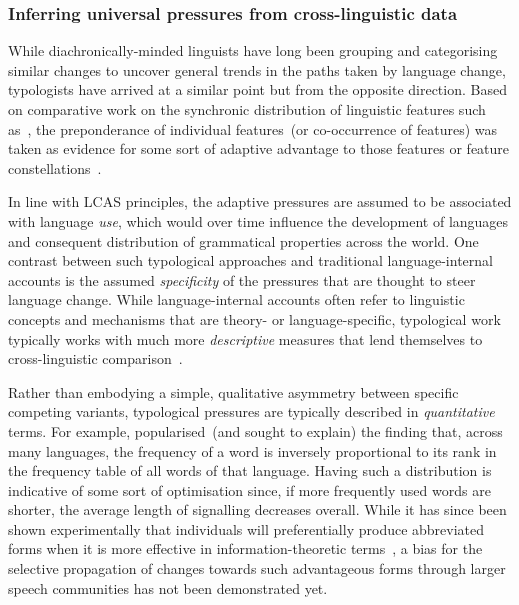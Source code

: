 \subsubsection{Inferring universal pressures from cross-linguistic data}

While diachronically-minded linguists have long been grouping and categorising similar changes to uncover general trends in the paths taken by language change, typologists have arrived at a similar point but from the opposite direction. Based on comparative work on the synchronic distribution of linguistic features such as~\citet{Greenberg1963}, the preponderance of individual features~(or co-occurrence of features) was taken as evidence for some sort of adaptive advantage to those features or feature constellations~\citep{Haspelmath2008}.

In line with LCAS principles, the adaptive pressures are assumed to be associated with language \emph{use}, which would over time influence the development of languages and consequent distribution of grammatical properties across the world.
One contrast between such typological approaches and traditional language-internal accounts is the assumed \emph{specificity} of the pressures that are thought to steer language change. While language-internal accounts often refer to linguistic concepts and mechanisms that are theory- or language-specific, typological work typically works with much more \emph{descriptive} measures that lend themselves to cross-linguistic comparison~\citep{Haspelmath2010}.

Rather than embodying a simple, qualitative asymmetry between specific competing variants, typological pressures are typically described in \emph{quantitative} terms. 
For example, \citet{Zipf1935,Zipf1949} popularised~(and sought to explain) the finding that, across many languages, the frequency of a word is inversely proportional to its rank in the frequency table of all words of that language.
Having such a distribution is indicative of some sort of optimisation since, if more frequently used words are shorter, the average length of signalling decreases overall. While it has since been shown experimentally that individuals will preferentially produce abbreviated forms when it is more effective in information-theoretic terms~\citep{Mahowald2013,Kanwal2017}, a bias for the selective propagation of changes towards such advantageous forms through larger speech communities has not been demonstrated yet.

